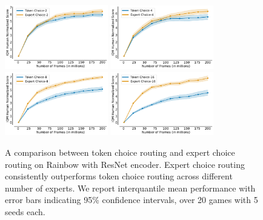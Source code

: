 \begin{figure}[h!]
    \centering
    \includegraphics[width=0.4\textwidth]{figures/results/TokenChoiceVsExpertChoice-2.pdf}
    \includegraphics[width=0.4\textwidth]{figures/results/TokenChoiceVsExpertChoice-4.pdf}
    \includegraphics[width=0.4\textwidth]{figures/results/TokenChoiceVsExpertChoice-8.pdf}
    \includegraphics[width=0.4\textwidth]{figures/results/TokenChoiceVsExpertChoice-16.pdf}
    \vspace{-0.4cm}
    \caption{A comparison between token choice routing and expert choice routing on Rainbow with ResNet encoder. Expert choice routing consistently outperforms token choice routing across different number of experts. We report interquantile mean performance with error bars indicating 95\% confidence intervals, over 20 games with 5 seeds each.}
    \label{fig:tokenvsexpert}
    \vspace{-0.2cm}
\end{figure}

\newpage

